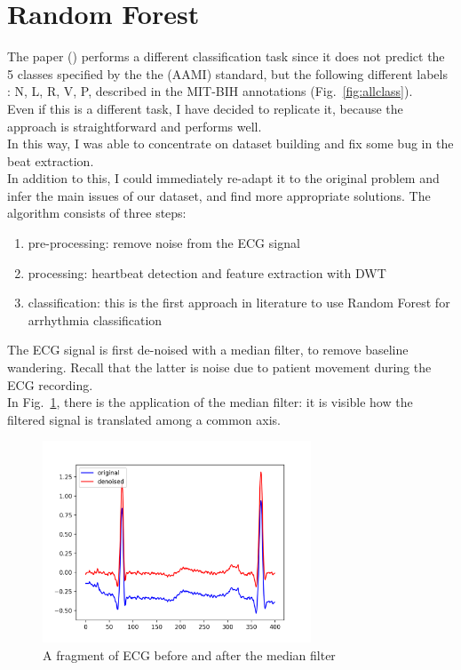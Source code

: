 \documentclass[LaM,binding=0.6cm]{sapthesis}
\begin{document}
\section{Random Forest \cite{forest}}
The paper (\cite{forest}) performs  a different classification task since it does not predict the 5 classes specified by the the (AAMI) standard, but the following different labels : N, L, R, V, P, described in the MIT-BIH annotations (Fig.~\ref{fig:allclass}).\\Even if this is a different task, I have decided to replicate it, because the approach is straightforward and performs well.\\In this way, I was able to concentrate on dataset building and fix some bug in the beat extraction.\\In addition to this, I could immediately re-adapt it to the original problem and infer the main issues of our dataset, and find more appropriate solutions.
The algorithm consists of three steps:
\begin{enumerate}
\item pre-processing: remove noise from the ECG signal
\item processing: heartbeat detection and feature extraction with DWT
\item classification: this is the first approach in literature to use Random Forest for arrhythmia classification
\end{enumerate} 
The ECG signal is first de-noised with a median filter, to remove baseline wandering. Recall that the latter is noise due to patient movement during the ECG recording.\\In Fig.~\ref{fig:rf1}, there is the application of the median filter: it is visible how the filtered signal is translated among a common axis. 
\begin{figure}[H]  \centering
	\includegraphics[width=80mm,scale=0.7]{random-forest-before-after}
	\caption{A fragment of ECG before and after the median filter}
	\label{fig:rf1}
\end{figure}
\end{document}
